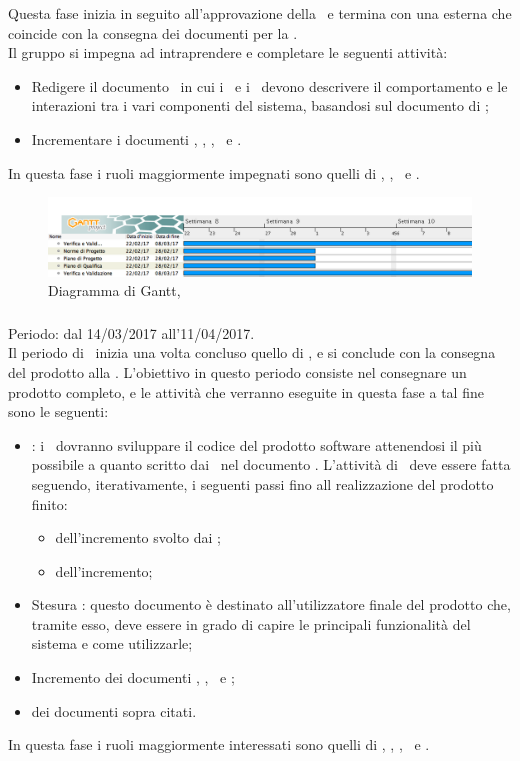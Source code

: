Questa fase inizia in seguito all'approvazione della \PA\ e termina con una  esterna che coincide con la consegna dei documenti per la \RP.\\
Il gruppo si impegna ad intraprendere e completare le seguenti attività:
\begin{itemize}
\item
Redigere il documento \DDP\ in cui i \ProgrP\ e i \ProgP\ devono descrivere il comportamento e le interazioni tra i vari componenti del sistema, basandosi sul documento di \ST;
\item
Incrementare i documenti \NdP, \PdP, \PdQ, \ST\ e \Gl.
\end{itemize}
In questa fase i ruoli maggiormente impegnati sono quelli di \Prog, \Pm, \Ver\ e \Am.

 \begin{figure}[H]
	\centering 
	\includegraphics[scale=0.4]{Immagini/Gantt/PD.png}
	\caption{Diagramma di Gantt, \PD}
\end{figure}

\subsubsection{\COD}
Periodo: dal 14/03/2017 all'11/04/2017. \\

Il periodo di \COD\ inizia una volta concluso quello di \PD, e si conclude con la consegna del prodotto alla \RQ. L'obiettivo in questo periodo consiste nel consegnare un prodotto completo, e le attività che verranno eseguite in questa fase a tal fine sono le seguenti:
\begin{itemize}
	\item \COD: i \ProgrP\ dovranno sviluppare il codice del prodotto software attenendosi il più possibile a quanto scritto dai \ProgP\ nel documento \DDP. L'attività di \COD\ deve essere fatta seguendo, iterativamente, i seguenti passi fino all realizzazione del prodotto finito:
			\begin{itemize}
				\item {} dell'incremento svolto dai \ProgP;
				\item {} dell'incremento;
			\end{itemize}
	\item Stesura \MU: questo documento è destinato all'utilizzatore finale del prodotto che, tramite esso, deve essere in grado di capire le principali funzionalità del sistema e come utilizzarle;
	\item Incremento dei documenti \NdP, \PdP, \PdQ\ e \Gl;
	\item {} dei documenti sopra citati.
\end{itemize}
In questa fase i ruoli maggiormente interessati sono quelli di \Am, \Pm, \Prog, \Progr\ e \Ver.

